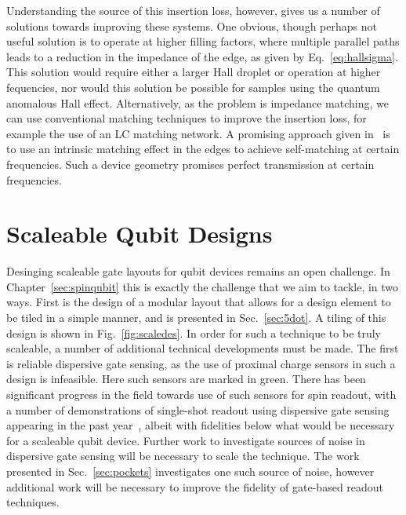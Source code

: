 Understanding the source of this insertion loss, however, gives us a number of solutions towards improving these systems. One obvious, though perhaps
not useful solution is to operate at higher filling factors, where multiple parallel paths leads to a reduction in the impedance of the edge, as
given by Eq.~\ref{eq:hallsigma}. This solution would require either a larger Hall droplet or operation at higher fequencies, nor would this solution
be possible for samples using the quantum anomalous Hall effect. Alternatively, as the problem is impedance matching, we can use conventional matching
techniques to improve the insertion loss, for example the use of an LC matching network. A promising approach given in~\cite{bosco2016self} is to use
an intrinsic matching effect in the edges to achieve self-matching at certain frequencies. Such a device geometry promises perfect transmission at certain
frequencies.

\section{Scaleable Qubit Designs}
Desinging scaleable gate layouts for qubit devices remains an open challenge. In Chapter~\ref{sec:spinqubit} this is exactly the challenge that we aim to
tackle, in two ways. First is the design of a modular layout that allows for a design element to be tiled in a simple manner, and is presented in Sec.~\ref{sec:5dot}.
A tiling of this design is shown in Fig.~\ref{fig:scaledes}. In order for such a technique to be truly scaleable, a number of additional technical developments
must be made. The first is reliable dispersive gate sensing, as the use of proximal charge sensors in such a design is infeasible. Here such sensors are marked in green.
There has been significant progress in the field towards use of such sensors for spin readout, with a number of demonstrations of single-shot readout using dispersive
gate sensing appearing in the past year~\cite{Nnano_dzurak,PhysRevApplied.11.044061}, albeit with fidelities below what would be necessary for a scaleable qubit
device. Further work to investigate sources of noise in dispersive gate sensing will be necessary to scale the technique. The work presented in Sec.~\ref{sec:pockets}
investigates one such source of noise, however additional work will be necessary to improve the fidelity of gate-based readout techniques.

